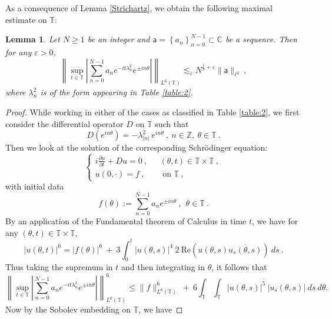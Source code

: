 \documentclass[12pt]{amsart}
\newtheorem{lemma}[theorem]{Lemma}
\theoremstyle{definition}
\newcommand{\C}{\mathbb C}%
\newcommand{\Z}{\mathbb Z}%
\newcommand{\T}{\mathbb T}%
\newcommand{\sa}{\textsf{a}}
\numberwithin{equation}{section}
\begin{document}
As a consequence of Lemma \ref{Strichartz}, we obtain the following maximal estimate on $\T$:
\begin{lemma} \label{max_estimate_circle}
Let $N \ge 1$ be an integer and $\sa =\left\{a_n\right\}_{n=0}^{N-1} \subset \C$ be a sequence. Then for any $\varepsilon>0$,
\begin{equation*}
\left\|\sup_{t \in \T}\left|\sum_{n=0}^{N-1} a_n e^{-it\lambda^2_n}e^{\pm in\theta}\right| \right\|_{L^6(\T )} \lesssim_\varepsilon N^{\frac{1}{3}+\varepsilon} \|\sa\|_{\ell^2}\:, 
\end{equation*}
where $\lambda^2_n$ is of the form appearing in Table \ref{table:2}.
\end{lemma}
\begin{proof}
While working in either of the cases as classified in Table \ref{table:2}, we first consider the differential operator $D$ on $\T$ such that
\begin{equation*}
D(e^{in\theta}) = -\lambda^2_{|n|}\:e^{in\theta}\:, \: n \in \Z,\: \theta \in \T\:. 
\end{equation*}
Then we look at the solution of the corresponding Schr\"odinger equation:
\begin{equation} \label{max_estimate_circle_eq1}
\begin{cases}
	 i\frac{\partial u}{\partial t} +Du=0\:,\:\:\:  &(\theta,t) \in \T \times \T\:, \\
	u(0,\cdot)=f\:, &\text{ on } \T \:,
	\end{cases}
\end{equation}
with initial data
\begin{equation*}
f(\theta):=\sum_{n=0}^{N-1}a_n e^{\pm in\theta}\:,\:\:\theta \in \T\:.
\end{equation*}
By an application of the Fundamental theorem of Calculus in time $t$, we have for any $(\theta,t) \in \T \times \T$,
\begin{equation*}
|u(\theta,t)|^6 = |f(\theta)|^6 \:+\: 3\int_0^t |u(\theta,s)|^4\: 2\:\text{Re}\left(u(\theta,s)\overline{u_s(\theta,s)}\right)\:ds\:.
\end{equation*}
Thus taking the supremum in $t$ and then integrating in $\theta$, it follows that
\begin{equation} \label{max_estimate_circle_eq2}
\left\|\sup_{t \in \T}\left|\sum_{n=0}^{N-1} a_n e^{-it\lambda^2_n}e^{\pm in\theta}\right| \right\|^6_{L^6(\T )} \le \|f\|^6_{L^6(\T )} \:+\: 6\int_\T\int_\T |u(\theta,s)|^5\:|u_s(\theta,s)|\:ds\:d\theta.
\end{equation}
Now by the Sobolev embedding on $\T$, we have

\end{proof}
\end{document}
